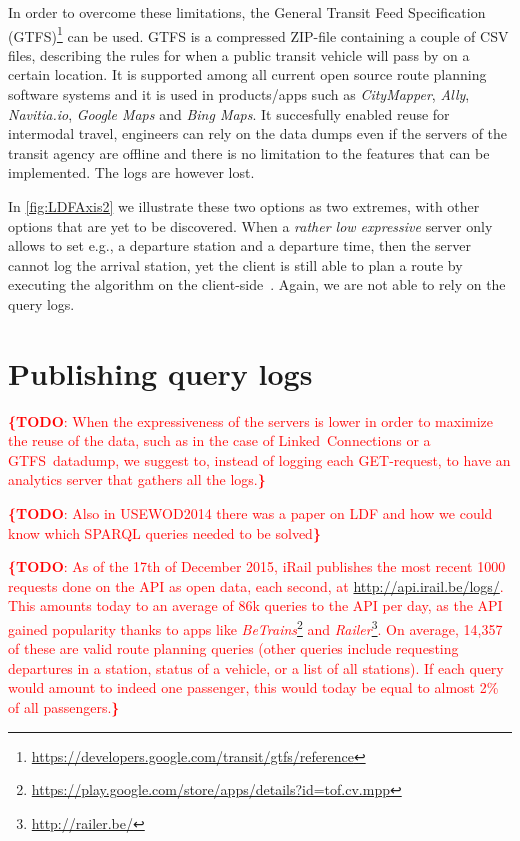 \documentclass{sig-alternate}
\newcommand{\todo}[1]{\noindent\textcolor{red}{{\bf \{TODO}: #1{\bf \}}}}
\begin{document}
In order to overcome these limitations, the General Transit Feed Specification (GTFS)\footnote{\url{https://developers.google.com/transit/gtfs/reference}} can be used. 
GTFS is a compressed ZIP-file containing a couple of CSV files, describing the rules for when a public transit vehicle will pass by on a certain location.
It is supported among all current open source route planning software systems and it is used in products/apps such as \emph{CityMapper}, \emph{Ally}, \emph{Navitia.io}, \emph{Google Maps} and \emph{Bing Maps}.
It succesfully enabled reuse for intermodal travel, engineers can rely on the data dumps even if the servers of the transit agency are offline and there is no limitation to the features that can be implemented.
The logs are however lost.

In \cref{fig:LDFAxis2} we illustrate these two options as two extremes, with other options that are yet to be discovered.
When a \emph{rather low expressive} server only allows to set e.g., a departure station and a departure time, then the server cannot log the arrival station, yet the client is still able to plan a route by executing the algorithm on the client-side~\cite{lc}.
Again, we are not able to rely on the query logs.

\section{Publishing query logs}
\label{sec:publishingquerylogs}

\todo{When the expressiveness of the servers is lower in order to maximize the reuse of the data, such as in the case of Linked~Connections or a GTFS~datadump, we suggest to, instead of logging each GET-request, to have an analytics server that gathers all the logs.}

\todo{Also in USEWOD2014 there was a paper on LDF and how we could know which SPARQL queries needed to be solved}

\todo{As of the 17th of December 2015, iRail publishes the most recent 1000 requests done on the API as open data, each second, at \url{http://api.irail.be/logs/}.
This amounts today to an average of 86k queries to the API per day, as the API gained popularity thanks to apps like \emph{BeTrains}\footnote{\url{https://play.google.com/store/apps/details?id=tof.cv.mpp}} and \emph{Railer}\footnote{\url{http://railer.be/}}.
On average, 14,357 of these are valid route planning queries (other queries include requesting departures in a station, status of a vehicle, or a list of all stations).
If each query would amount to indeed one passenger, this would today be equal to almost 2\% of all passengers.}
\end{document}
